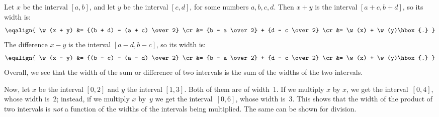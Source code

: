 Let $x$ be the interval $[a, b]$, and let $y$ be the interval $[c, d]$, for some numbers $a, b, c, d$.  Then $x+y$ is the interval $[a+c, b+d]$, so its width is:
$$
\def\w{\mathop{\rm width}}
\eqalign{
\w(x + y) &= {(b + d) - (a + c) \over 2} \cr
          &= {b - a \over 2} + {d - c \over 2} \cr
          &= \w(x) + \w(y)\hbox{.}
}
$$
The difference $x-y$ is the interval $[a - d, b - c]$, so its width is:
$$
\def\w{\mathop{\rm width}}
\eqalign{
\w(x - y) &= {(b - c) - (a - d) \over 2} \cr
          &= {b - a \over 2} + {d - c \over 2} \cr
          &= \w(x) + \w(y)\hbox{.}
}
$$
Overall, we see that the width of the sum or difference of two intervals is the sum of the widths of the two intervals. 

Now, let $x$ be the interval $[0,2]$ and $y$ the interval $[1,3]$.  Both of them are of width~$1$.  If we multiply $x$ by $x$, we get the interval~$[0,4]$, whose width is~$2$;  instead, if we multiply $x$ by~$y$ we get the interval~$[0,6]$, whose width is~$3$.  This shows that the width of the product of two intervals is {\em not} a function of the widths of the intervals being multiplied.  The same can be shown for division.
